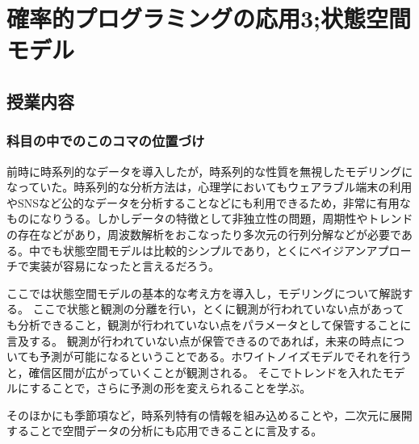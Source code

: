 \section{確率的プログラミングの応用3;状態空間モデル}
\subsection{授業内容}
\subsubsection{科目の中でのこのコマの位置づけ}
前時に時系列的なデータを導入したが，時系列的な性質を無視したモデリングになっていた。時系列的な分析方法は，心理学においてもウェアラブル端末の利用やSNSなど公的なデータを分析することなどにも利用できるため，非常に有用なものになりうる。しかしデータの特徴として非独立性の問題，周期性やトレンドの存在などがあり，周波数解析をおこなったり多次元の行列分解などが必要である。中でも状態空間モデルは比較的シンプルであり，とくにベイジアンアプローチで実装が容易になったと言えるだろう。

ここでは状態空間モデルの基本的な考え方を導入し，モデリングについて解説する。
ここで状態と観測の分離を行い，とくに観測が行われていない点があっても分析できること，観測が行われていない点をパラメータとして保管することに言及する。
観測が行われていない点が保管できるのであれば，未来の時点についても予測が可能になるということである。ホワイトノイズモデルでそれを行うと，確信区間が広がっていくことが観測される。
そこでトレンドを入れたモデルにすることで，さらに予測の形を変えられることを学ぶ。

そのほかにも季節項など，時系列特有の情報を組み込めることや，二次元に展開することで空間データの分析にも応用できることに言及する。
